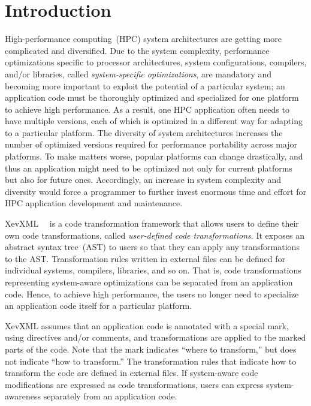 \chapter{Introduction}\label{chap:intro}

High-performance computing~(HPC) system architectures are getting more
complicated and diversified. Due to the system complexity, performance
optimizations specific to processor architectures, system
configurations, compilers, and/or libraries, called
\emph{system-specific optimizations}, are mandatory and becoming more
important to exploit the potential of a particular system; an
application code must be thoroughly optimized and specialized for one
platform to achieve high performance.  As a result, one HPC application
often needs to have multiple versions, each of which is optimized in a
different way for adapting to a particular platform.  The diversity of
system architectures increases the number of optimized versions required
for performance portability across major platforms.  To make matters
worse, popular platforms can change drastically, and thus an application
might need to be optimized not only for current platforms but also for
future ones.  Accordingly, an increase in system complexity and
diversity would force a programmer to further invest enormous time and
effort for HPC application development and maintenance.



XevXML~\cite{xevxml-hipc}~\cite{xevxml-sc13} is a code transformation
framework that allows users to define their own code transformations,
called \emph{user-defined code transformations}.  It exposes an
abstract syntax tree~(AST) to users so that they can apply any
transformations to the AST. Transformation rules written in external
files can be defined for individual systems, compilers, libraries, and
so on.  That is, code transformations representing system-aware
optimizations can be separated from an application code.  Hence, to
achieve high performance, the users no longer need to specialize an
application code itself for a particular platform.

XevXML assumes that an application code is annotated with a special
mark, using directives and/or comments, and transformations are applied
to the marked parts of the code.  Note that the mark indicates ``where
to transform,'' but does not indicate ``how to transform.''  The
transformation rules that indicate how to transform the code are defined
in external files. If system-aware code modifications are expressed as
code transformations, users can express system-awareness separately from
an application code.

